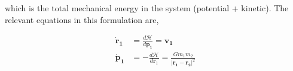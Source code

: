 \documentclass{article}
\newcommand{\norm}[1]{\ensuremath{\left\vert #1 \right \vert}}
\newcommand{\vb}[1]{\ensuremath{\mathbf{#1}}}
\begin{document}
\noindent which is the total mechanical energy in the system (potential + kinetic). The relevant equations in this formulation are,

\begin{align}
    \vb{\dot{r}_1} &= \frac{d \mathcal{H}}{d \vb{p_1}} = \vb{v_1} \\
    \vb{\dot{p}_1} &= - \frac{d \mathcal{H}}{d \vb{r}_1} = \frac{G m_1 m_2}{ \norm{\vb{r_1} - \vb{r_2}}^2 }\\
\end{align}
\end{document}
